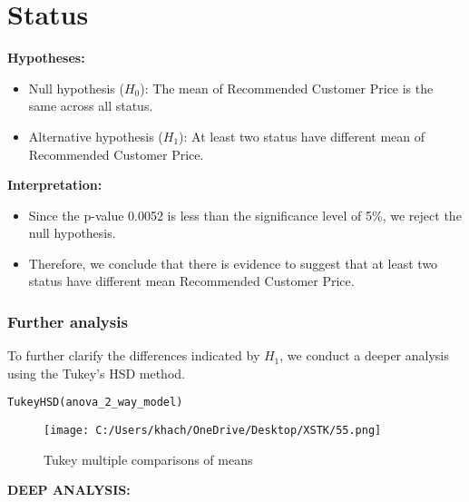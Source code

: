 \documentclass[a4paper]{article}
\begin{document}
	\section*{Status}
	\textbf{Hypotheses:}
	\begin{itemize}
		\item Null hypothesis (\(H_0\)): The mean of Recommended Customer Price is the same across all status.
		\item Alternative hypothesis (\(H_1\)): At least two status have different mean of Recommended Customer Price.
	\end{itemize}
	\textbf{Interpretation:}
	\begin{itemize}
		\item Since the p-value 0.0052 is less than the significance level of 5\%, we reject the null hypothesis.
		\item Therefore, we conclude that there is evidence to suggest that at least two status have different mean Recommended Customer Price.
	\end{itemize}
	\subsubsection{Further analysis}
	To further clarify the differences indicated by \( H_1 \), we conduct a deeper analysis using the Tukey's HSD method.
	\begin{lstlisting}[frame=single, backgroundcolor=\color{gray!10}, breaklines=true, columns=fullflexible]
	TukeyHSD(anova_2_way_model)
	\end{lstlisting}
	\begin{figure}[htbp]
		\centering
		\begin{adjustbox}{width=0.7\textwidth, frame}
			\texttt{[image: C:/Users/khach/OneDrive/Desktop/XSTK/55.png]}
		\end{adjustbox}
		\captionsetup{justification=centering}
		\vspace{0.5cm}
		\caption{Tukey multiple comparisons of means}
	\end{figure}
	\newpage
	\textbf{DEEP ANALYSIS:}
\end{document}
